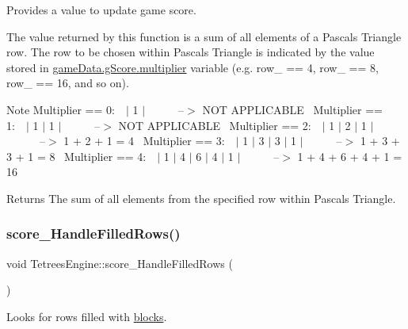 Provides a value to update game score. 

The value returned by this function is a sum of all elements of a Pascal\textquotesingle{}s Triangle row. The row to be chosen within Pascal\textquotesingle{}s Triangle is indicated by the value stored in \mbox{\hyperlink{structgame__score__t}{game\+Data.g\+Score.multiplier}} variable (e.\+g. row\+\_ == 4, row\+\_ == 8, row\+\_ == 16, and so on). \begin{DoxyNote}{Note}
Multiplier == 0\+:~~$\vert$ 1 $\vert$~~~~~~--$>$ N\+OT A\+P\+P\+L\+I\+C\+A\+B\+LE~\newline
 Multiplier == 1\+:~~$\vert$ 1 $\vert$ 1 $\vert$~~~~~~--$>$ N\+OT A\+P\+P\+L\+I\+C\+A\+B\+LE~\newline
 Multiplier == 2\+:~~$\vert$ 1 $\vert$ 2 $\vert$ 1 $\vert$~~~~~~--$>$ 1 + 2 + 1 = 4~\newline
 Multiplier == 3\+:~~$\vert$ 1 $\vert$ 3 $\vert$ 3 $\vert$ 1 $\vert$~~~~~~--$>$ 1 + 3 + 3 + 1 = 8~\newline
 Multiplier == 4\+:~~$\vert$ 1 $\vert$ 4 $\vert$ 6 $\vert$ 4 $\vert$ 1 $\vert$~~~~~~--$>$ 1 + 4 + 6 + 4 + 1 = 16~\newline

\end{DoxyNote}
\begin{DoxyReturn}{Returns}
The sum of all elements from the specified row within Pascal\textquotesingle{}s Triangle. 
\end{DoxyReturn}
\mbox{\label{classTetreesEngine_ad379bf5d98a182411d4d91b12b6ef5ba}} 
\subsubsection{\texorpdfstring{score\+\_\+\+Handle\+Filled\+Rows()}{score\_HandleFilledRows()}}
{\footnotesize\ttfamily void Tetrees\+Engine\+::score\+\_\+\+Handle\+Filled\+Rows (\begin{DoxyParamCaption}{ }\end{DoxyParamCaption})\hspace{0.3cm}{\ttfamily [private]}}



Looks for rows filled with \mbox{\hyperlink{TetreesDefs_8hpp_ad8f0654cf997b7ea7eb14924d0b1ea33}{blocks}}. 

